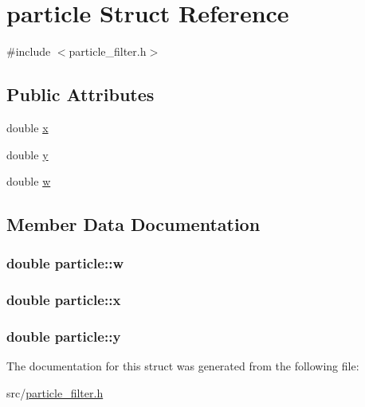 \hypertarget{structparticle}{\section{particle Struct Reference}
\label{structparticle}
}


{\ttfamily \#include $<$particle\-\_\-filter.\-h$>$}

\subsection*{Public Attributes}
\begin{DoxyCompactItemize}
\item 
double \hyperlink{structparticle_adf124f2f4b2d0a90306893c2889fb1a6}{x}
\item 
double \hyperlink{structparticle_aafbd59d3b7e2d80b6c77a63be017a758}{y}
\item 
double \hyperlink{structparticle_a4bfe3ecd1a5c105adbc7f93158151757}{w}
\end{DoxyCompactItemize}


\subsection{Member Data Documentation}
\hypertarget{structparticle_a4bfe3ecd1a5c105adbc7f93158151757}{
\subsubsection[{w}]{\setlength{\rightskip}{0pt plus 5cm}double particle\-::w}}\label{structparticle_a4bfe3ecd1a5c105adbc7f93158151757}
\hypertarget{structparticle_adf124f2f4b2d0a90306893c2889fb1a6}{
\subsubsection[{x}]{\setlength{\rightskip}{0pt plus 5cm}double particle\-::x}}\label{structparticle_adf124f2f4b2d0a90306893c2889fb1a6}
\hypertarget{structparticle_aafbd59d3b7e2d80b6c77a63be017a758}{
\subsubsection[{y}]{\setlength{\rightskip}{0pt plus 5cm}double particle\-::y}}\label{structparticle_aafbd59d3b7e2d80b6c77a63be017a758}


The documentation for this struct was generated from the following file\-:\begin{DoxyCompactItemize}
\item 
src/\hyperlink{particle__filter_8h}{particle\-\_\-filter.\-h}\end{DoxyCompactItemize}
